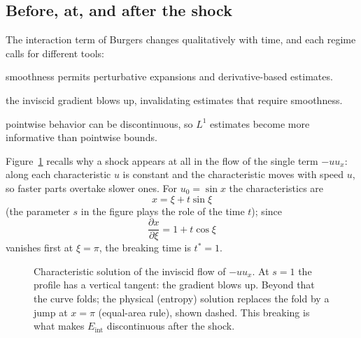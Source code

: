 \documentclass[11pt,a4paper]{article}
\theoremstyle{definition}
\newcommand{\Eint}{E_{\mathrm{int}}}
\begin{document}
\subsection{Before, at, and after the shock}
The interaction term of Burgers changes qualitatively with time, and each regime calls for different tools:
\begin{description}[nosep,leftmargin=3.2cm,labelwidth=3.0cm]
\item[Before shock formation] smoothness permits perturbative expansions and derivative-based estimates.
\item[At breaking] the inviscid gradient blows up, invalidating estimates that require smoothness.
\item[After shock formation] pointwise behavior can be discontinuous, so $L^1$ estimates become more informative than pointwise bounds.
\end{description}
Figure~\ref{fig:burgers} recalls why a shock appears at all in the flow of the single term $-uu_x$: along each characteristic $u$ is constant and the characteristic moves with speed $u$, so faster parts overtake slower ones. For $u_0=\sin x$ the characteristics are
\[
x=\xi+t\sin\xi
\]
(the parameter $s$ in the figure plays the role of the time $t$); since
\[
\frac{\partial x}{\partial\xi}=1+t\cos\xi
\]
vanishes first at $\xi=\pi$, the breaking time is $t^*=1$.
\begin{figure}[!htb]
\centering
{}
\caption{Characteristic solution of the inviscid flow of $-uu_x$. At $s=1$ the profile has a vertical tangent: the gradient blows up. Beyond that the curve folds; the physical (entropy) solution replaces the fold by a jump at $x=\pi$ (equal-area rule), shown dashed. This breaking is what makes $\Eint$ discontinuous after the shock.}\label{fig:burgers}
\end{figure}
\end{document}
